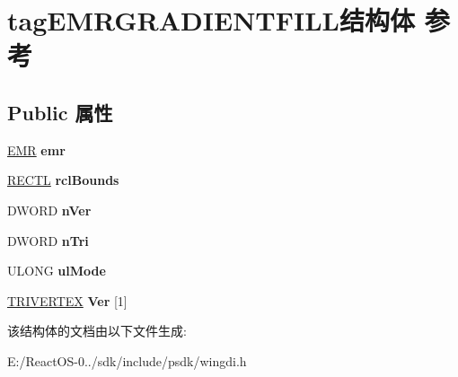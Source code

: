 \hypertarget{structtag_e_m_r_g_r_a_d_i_e_n_t_f_i_l_l}{}\section{tag\+E\+M\+R\+G\+R\+A\+D\+I\+E\+N\+T\+F\+I\+L\+L结构体 参考}
\label{structtag_e_m_r_g_r_a_d_i_e_n_t_f_i_l_l}
\subsection*{Public 属性}
\begin{DoxyCompactItemize}
\item 
\mbox{\label{structtag_e_m_r_g_r_a_d_i_e_n_t_f_i_l_l_afb3f152124f4451136130dfd90fff12c}} 
\hyperlink{structtag_e_m_r}{E\+MR} {\bfseries emr}
\item 
\mbox{\label{structtag_e_m_r_g_r_a_d_i_e_n_t_f_i_l_l_a7682c937e9415cae2d2f46f852ec7651}} 
\hyperlink{struct___r_e_c_t_l}{R\+E\+C\+TL} {\bfseries rcl\+Bounds}
\item 
\mbox{\label{structtag_e_m_r_g_r_a_d_i_e_n_t_f_i_l_l_a1989ddcd6f0311a3af7383af1454d00f}} 
D\+W\+O\+RD {\bfseries n\+Ver}
\item 
\mbox{\label{structtag_e_m_r_g_r_a_d_i_e_n_t_f_i_l_l_a46ff2ce50795d1cc078e063873bc0221}} 
D\+W\+O\+RD {\bfseries n\+Tri}
\item 
\mbox{\label{structtag_e_m_r_g_r_a_d_i_e_n_t_f_i_l_l_ab7bba879c81bb44816ad4e86dfe983d2}} 
U\+L\+O\+NG {\bfseries ul\+Mode}
\item 
\mbox{\label{structtag_e_m_r_g_r_a_d_i_e_n_t_f_i_l_l_a822fea86eeacd768b747183ce00628ca}} 
\hyperlink{struct___t_r_i_v_e_r_t_e_x}{T\+R\+I\+V\+E\+R\+T\+EX} {\bfseries Ver} \mbox{[}1\mbox{]}
\end{DoxyCompactItemize}


该结构体的文档由以下文件生成\+:\begin{DoxyCompactItemize}
\item 
E\+:/\+React\+O\+S-\/0../sdk/include/psdk/wingdi.\+h\end{DoxyCompactItemize}
